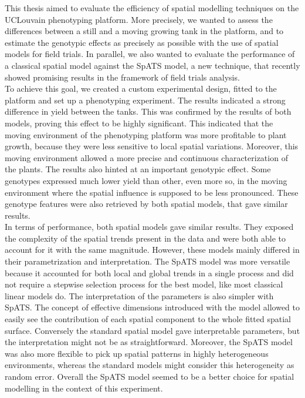 
This thesis aimed to evaluate the efficiency of spatial modelling techniques on the UCLouvain phenotyping platform. More precisely, we wanted to assess the differences between a still and a moving growing tank in the platform, and to estimate the genotypic effects as precisely as possible with the use of spatial models for field trials. In parallel, we also wanted to evaluate the performance of a classical spatial model against the SpATS model, a new technique, that recently showed promising results in the framework of field trials analysis.\\

To achieve this goal, we created a custom experimental design, fitted to the platform and set up a phenotyping experiment. The results indicated a strong difference in yield between the tanks. This was confirmed by the results of both models, proving this effect to be highly significant. This indicated that the moving environment of the phenotyping platform was more profitable to plant growth, because they were less sensitive to local spatial variations. Moreover, this moving environment allowed a more precise and continuous characterization of the plants. The results also hinted at an important genotypic effect. Some genotypes expressed much lower yield than other, even more so, in the moving environment where the spatial influence is supposed to be less pronounced. These genotype features were also retrieved by both spatial models, that gave similar results.\\

In terms of performance, both spatial models gave similar results. They exposed the complexity of the spatial trends present in the data and were both able to account for it with the same magnitude. However, these models mainly differed in their parametrization and interpretation. The SpATS model was more versatile because it accounted for both local and global trends in a single process and did not require a stepwise selection process for the best model, like most classical linear models do. The interpretation of the parameters is also simpler with SpATS. The concept of effective dimensions introduced with the model allowed to easily see the contribution of each spatial component to the whole fitted spatial surface. Conversely the standard spatial model gave interpretable parameters, but the interpretation might not be as straightforward. Moreover, the SpATS model was also more flexible to pick up spatial patterns in highly heterogeneous environments, whereas the standard models might consider this heterogeneity as random error. Overall the SpATS model seemed to be a better choice for spatial modelling in the context of this experiment. \\

